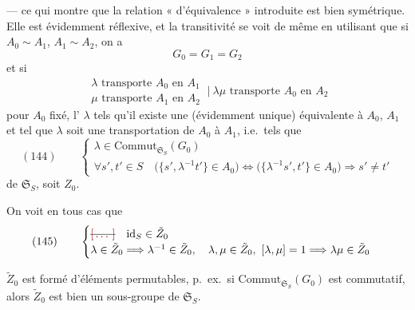 \documentclass[11pt,a4paper]{article}
\begin{document}
— ce qui montre que la relation « d'équivalence » introduite est bien symétrique.
Elle est évidemment réflexive, et la transitivité se voit de même en utilisant que
si $A_0\sim A_1$, $A_1\sim A_2$, \struck{\ill{}} on a
\[
  G_0 = G_1 = G_2
\]
et si
\[
  \begin{array}{l}
    \lambda \text{ transporte } A_0 \text{ en } A_1\\
    \mu \text{ transporte } A_1 \text{ en } A_2
  \end{array}
  \ \Big|\ \lambda\mu \text{ transporte } A_0 \text{ en } A_2
\]
  pour $A_0$ fixé, l'
  $\lambda$ tels qu'il 
existe une (évidemment unique) équivalente à $A_0$, $A_1$ et tel que $\lambda$ soit
une transportation de $A_0$ à $A_1$, i.e.\ tels que
\[
  (144)\qquad
  \begin{cases}
    \lambda\in\mathrm{Commut}_{\mathfrak{S}_S}(G_0)\\
    \forall s',t'\in S \quad
      \bigl(\{s',\lambda^{-1}t'\}\in A_0\bigr) \Longleftrightarrow
      \bigl(\{\lambda^{-1}s',t'\}\in A_0\bigr) \Longrightarrow s'\neq t'
  \end{cases}
\]
 de $\mathfrak{S}_S$, soit $Z_0$.

On voit en tous cas que
\[
  (145)\qquad
  \begin{cases}
    \text{\struck{\ill{}}}\quad \mathrm{id}_S\in\tilde{Z}_0\\
    \lambda\in\tilde{Z}_0 \Longrightarrow \lambda^{-1}\in\tilde{Z}_0, \quad
      \lambda,\mu\in\tilde{Z}_0,\ [\lambda,\mu]=1 \Longrightarrow \lambda\mu\in\tilde{Z}_0
  \end{cases}
\]


$\tilde{Z}_0$ est formé d'éléments permutables, p.\ ex.\ si
$\mathrm{Commut}_{\mathfrak{S}_S}(G_0)$ est commutatif, alors $\tilde{Z}_0$ est bien
un sous-groupe de $\mathfrak{S}_S$.
\end{document}
